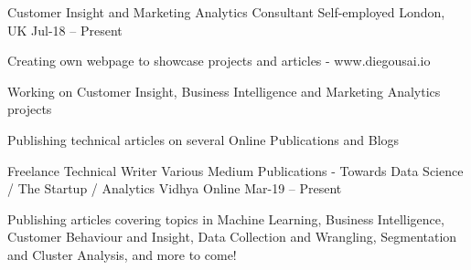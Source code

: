 

\begin{cventries}

  \cventry
    {Customer Insight and Marketing Analytics Consultant} %
    {Self-employed} %
    {London, UK} %
    {Jul-18 – Present} %
    {
      \begin{cvitems} %
        \item {Creating own webpage to showcase projects and articles - www.diegousai.io}
        \item {Working on Customer Insight, Business Intelligence and Marketing Analytics projects}
        \item {Publishing technical articles on several Online Publications and Blogs}
      \end{cvitems}
    }

  \cventry
    {Freelance Technical Writer} %
    {Various Medium Publications - Towards Data Science / The Startup / Analytics Vidhya} %
    {Online} %
    {Mar-19 – Present} %
    {
      \begin{cvitems} %
        \item {Publishing articles covering topics in Machine Learning, Business Intelligence, Customer Behaviour and Insight, Data Collection and Wrangling, Segmentation and Cluster Analysis, and more to come!}
      \end{cvitems}
    }


\end{cventries}
